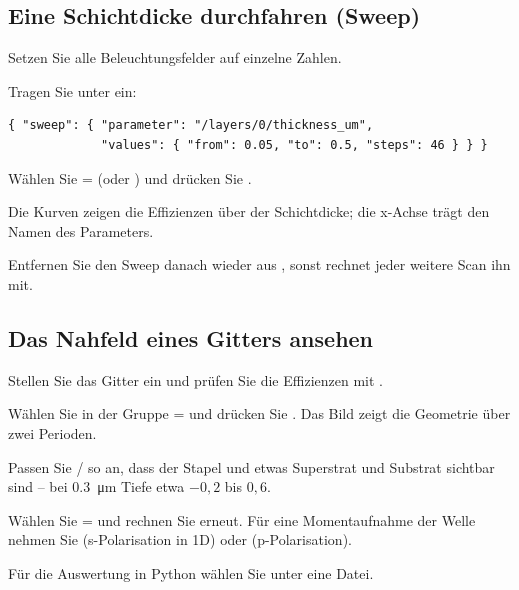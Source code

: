 \subsection{Eine Schichtdicke durchfahren (Sweep)}

\begin{schritte}
  \item Setzen Sie alle Beleuchtungsfelder auf einzelne Zahlen.
  \item Tragen Sie unter  ein:

\begin{lstlisting}
{ "sweep": { "parameter": "/layers/0/thickness_um",
             "values": { "from": 0.05, "to": 0.5, "steps": 46 } } }
\end{lstlisting}
  \item Wählen Sie  =  (oder ) und drücken Sie .
  \item Die Kurven zeigen die Effizienzen über der Schichtdicke; die x-Achse trägt den Namen des
    Parameters.
\end{schritte}

Entfernen Sie den Sweep danach wieder aus , sonst rechnet jeder weitere Scan ihn mit.

\subsection{Das Nahfeld eines Gitters ansehen}

\begin{schritte}
  \item Stellen Sie das Gitter ein und prüfen Sie die Effizienzen mit .
  \item Wählen Sie in der Gruppe   =  und drücken Sie
    . Das Bild zeigt die Geometrie über zwei Perioden.
  \item Passen Sie / so an, dass der Stapel und etwas Superstrat und Substrat
    sichtbar sind -- bei \qty{0.3}{\micro\metre} Tiefe etwa $-0{,}2$ bis $0{,}6$.
  \item Wählen Sie  =  und rechnen Sie erneut. Für eine Momentaufnahme der
    Welle nehmen Sie  (s-Polarisation in 1D) oder  (p-Polarisation).
  \item Für die Auswertung in Python wählen Sie unter  eine Datei.
\end{schritte}

